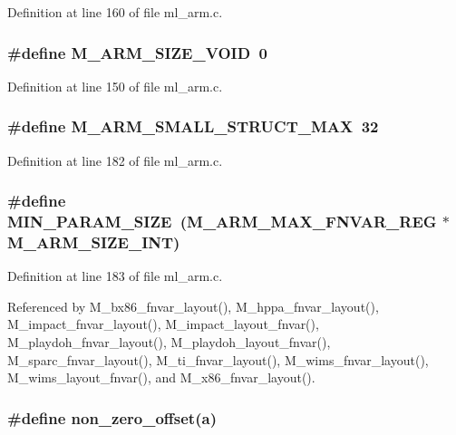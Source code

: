 Definition at line 160 of file ml\_\-arm.c.
\subsubsection{\setlength{\rightskip}{0pt plus 5cm}\#define M\_\-ARM\_\-SIZE\_\-VOID~0}\label{ml__arm_8c_ccd34ecb496e3bcdb0eded0f5f9505bf}




Definition at line 150 of file ml\_\-arm.c.
\subsubsection{\setlength{\rightskip}{0pt plus 5cm}\#define M\_\-ARM\_\-SMALL\_\-STRUCT\_\-MAX~32}\label{ml__arm_8c_af4fbb55e81a96f50d6d743b7873467c}




Definition at line 182 of file ml\_\-arm.c.
\subsubsection{\setlength{\rightskip}{0pt plus 5cm}\#define MIN\_\-PARAM\_\-SIZE~(M\_\-ARM\_\-MAX\_\-FNVAR\_\-REG $\ast$  M\_\-ARM\_\-SIZE\_\-INT)}\label{ml__arm_8c_48f1f5d33d6770a468f7767465e07abb}




Definition at line 183 of file ml\_\-arm.c.

Referenced by M\_\-bx86\_\-fnvar\_\-layout(), M\_\-hppa\_\-fnvar\_\-layout(), M\_\-impact\_\-fnvar\_\-layout(), M\_\-impact\_\-layout\_\-fnvar(), M\_\-playdoh\_\-fnvar\_\-layout(), M\_\-playdoh\_\-layout\_\-fnvar(), M\_\-sparc\_\-fnvar\_\-layout(), M\_\-ti\_\-fnvar\_\-layout(), M\_\-wims\_\-fnvar\_\-layout(), M\_\-wims\_\-layout\_\-fnvar(), and M\_\-x86\_\-fnvar\_\-layout().
\subsubsection{\setlength{\rightskip}{0pt plus 5cm}\#define non\_\-zero\_\-offset(a)}\label{ml__arm_8c_1a7d03fa0a676d3b09e555d8c8176f1b}


